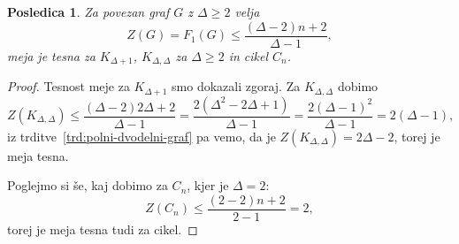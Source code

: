\documentclass[12pt,a4paper,twoside]{article}
\theoremstyle{definition} %
\theoremstyle{plain} %
\newtheorem{posledica}[definicija]{Posledica}
\numberwithin{equation}{section}  %
\begin{document}
\begin{posledica}
    Za povezan graf $G$ z $\Delta \geq 2$ velja
    \begin{equation}
        \label{eq:zgornja-meja-zf-povezan}
        Z(G) = F_1(G) \leq \frac{(\Delta - 2)n + 2}{\Delta - 1},
    \end{equation}
    meja je tesna za $K_{\Delta + 1}$, $K_{\Delta, \Delta}$ za $\Delta \geq 2$ in cikel $C_n$.
\end{posledica}
\begin{proof}
    Tesnost meje za $K_{\Delta + 1}$ smo dokazali zgoraj. Za $K_{\Delta, \Delta}$ dobimo
    \[ Z(K_{\Delta, \Delta}) \leq \frac{(\Delta - 2)2\Delta + 2}{\Delta - 1} = \frac{2(\Delta^2 - 2 \Delta + 1)}{\Delta - 1} = \frac{2(\Delta- 1)^2}{\Delta - 1} = 2 (\Delta-1), \]
    iz trditve~\ref{trd:polni-dvodelni-graf} pa vemo, da je $Z(K_{\Delta, \Delta}) = 2\Delta - 2$, torej je meja tesna.

    Poglejmo si še, kaj dobimo za $C_n$, kjer je $\Delta= 2$:
    \[ Z(C_n) \leq \frac{(2 - 2)n + 2}{2 - 1} = 2, \]
    torej je meja tesna tudi za cikel.
\end{proof}
\end{document}
